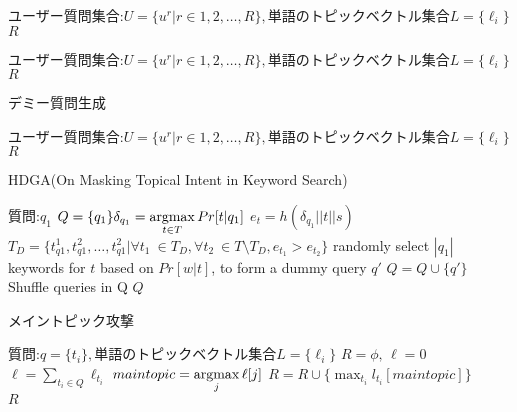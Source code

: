 \documentclass{jsarticle}
\theoremstyle{definition}
\newcommand{\argmax}{\mathop{\rm argmax}\limits}
\begin{document}
\begin{algorithm}
\caption{} 
\begin{algorithmic}[1]
    \Require ユーザー質問集合:$U=\{u^r | r \in {1,2, \dots , R}\},$単語のトピックベクトル集合$L=\{\ell_i\}$
    \Return $R$
\end{algorithmic}
\end{algorithm}

\begin{algorithm}
\caption{} 
\begin{algorithmic}[1]
    \Require ユーザー質問集合:$U=\{u^r | r \in {1,2, \dots , R}\},$単語のトピックベクトル集合$L=\{\ell_i\}$
    \Return $R$
\end{algorithmic}
\end{algorithm}


\begin{algorithm}
\caption{デミー質問生成}
\begin{algorithmic}[1]
    \Require ユーザー質問集合:$U=\{u^r | r \in {1,2, \dots , R}\},$単語のトピックベクトル集合$L=\{\ell_i\}$
    \Return $R$
\end{algorithmic}
\end{algorithm}


\begin{algorithm}
\caption{HDGA(On Masking Topical Intent in Keyword Search)}
\begin{algorithmic}[1]
    \Require 質問:$q_1$
    \State $Q = \{q_1\}\delta_{q_1} = \argmax_{t \in T} Pr[t|q_1]$
    \State $e_t = h(\delta_{q_1}||t||s)$
	\EndFor
    \State $T_D = \{t^1_{q1},t^2_{q1}, \dots , t^2_{q1} | \forall t_1 \ \in T_D , \forall t_2 \ \in T \setminus T_D, e_{t_1} > e_{t_2} \}$
	\While { $ \argmax_{t \in T} Pr[t|q'] \neq t$}
	\State randomly select $|q_1|$ keywords for $t$ based on $Pr[w|t]$, to form a dummy query $q'$
	\EndWhile
    \State $Q = Q \cup \{q'\}$
    \EndFor　
	\State Shuffle queries in Q
    \Return $Q$
\end{algorithmic}
\end{algorithm}



\begin{algorithm}
\caption{メイントピック攻撃}
\begin{algorithmic}[1]
    \Require 質問:$q=\{t_i\},$単語のトピックベクトル集合$L=\{\ell_i\}$
    \State $R=\phi, \, \ell=0$
    \State $\ell=\sum_{t_i \in Q}\ell_{t_i}$
    \State $maintopic = \argmax_j \ell[j]$
    \State $R=R \cup \{\max_{t_i}l_{t_i}[maintopic]\}$
    \EndFor　\\
    \Return $R$
\end{algorithmic}
\end{algorithm}
\end{document}

